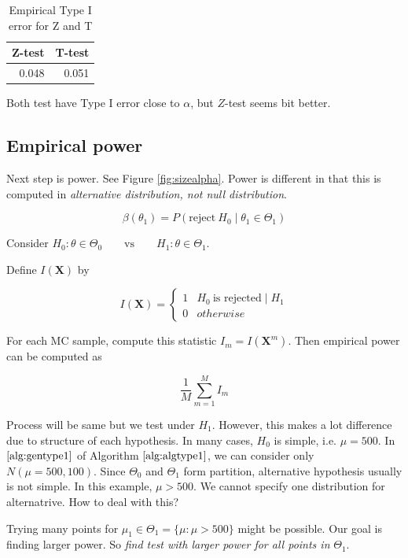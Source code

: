 \documentclass[]{book}
\theoremstyle{definition}
\theoremstyle{definition}
\theoremstyle{definition}
\theoremstyle{remark}
\let\BeginKnitrBlock\begin \let\EndKnitrBlock\end
\begin{document}
\begin{table}[t]

\caption{\label{tab:errmc}Empirical Type I error for Z and T}
\centering
\begin{tabular}{r|r}
\hline
Z-test & T-test\\
\hline
0.048 & 0.051\\
\hline
\end{tabular}
\end{table}

Both test have Type I error close to \(\alpha\), but \(Z\)-test seems bit better.

\hypertarget{empirical-power}{%
\subsection{Empirical power}\label{empirical-power}}

Next step is power. See Figure \ref{fig:sizealpha}. Power is different in that this is computed in \emph{alternative distribution, not null distribution}.

\[\beta(\theta_1) = P(\text{reject}\: H_0 \mid \theta_1 \in \Theta_1)\]

\BeginKnitrBlock{lemma}
\protect\hypertarget{lem:testalt}{}{\label{lem:testalt} }Consider \(H_0: \theta \in \Theta_0 \qquad \text{vs} \qquad H_1: \theta \in \Theta_1\).

Define \(I(\mathbf{X})\) by

\[
I(\mathbf{X}) = \begin{cases}
  1 & H_0 \:\text{is rejected} \mid H_1 \\
  0 & otherwise
\end{cases}
\]

For each MC sample, compute this statistic \(I_m = I(\mathbf{X}^{m})\). Then empirical power can be computed as

\[\frac{1}{M}\sum_{m = 1}^M I_m\]
\EndKnitrBlock{lemma}

Process will be same but we test under \(H_1\). However, this makes a lot difference due to structure of each hypothesis. In many cases, \(H_0\) is simple, i.e. \(\mu = 500\). In \(\ref{alg:gentype1}\) of Algorithm \(\ref{alg:algtype1}\), we can consider only \(N(\mu = 500, 100)\). Since \(\Theta_0\) and \(\Theta_1\) form partition, alternative hypothesis usually is not simple. In this example, \(\mu > 500\). We cannot specify one distribution for alternatrive. How to deal with this?

Trying many points for \(\mu_1 \in \Theta_1 = \{ \mu : \mu > 500 \}\) might be possible. Our goal is finding larger power. So \emph{find test with larger power for all points in} \(\Theta_1\).
\end{document}

